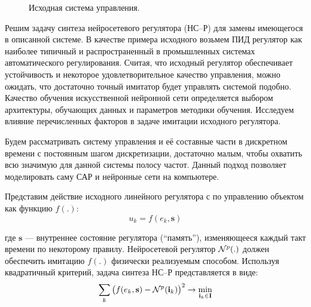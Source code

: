 \begin{figure}[h]
  \centering
  
  \caption{Исходная система управления.}
  \label{fig:ctrlloop}
\end{figure}

Решим задачу синтеза нейросетевого регулятора (НС--Р) для замены
имеющегося в описанной системе.  В качестве примера исходного возьмем
ПИД регулятор как наиболее типичный и распространенный в промышленных
системах автоматического регулирования.  Считая, что исходный
регулятор обеспечивает устойчивость и некоторое удовлетворительное
качество управления, можно ожидать, что достаточно точный имитатор
будет управлять системой подобно.  Качество обучения искусственной
нейронной сети определяется выбором архитектуры, обучающих данных и
параметров методики обучения.  Исследуем влияние перечисленных
факторов в задаче имитации исходного регулятора.

Будем рассматривать систему управления и её составные части в
дискретном времени с постоянным шагом дискретизации, достаточно малым,
чтобы охватить всю значимую для данной системы полосу частот.  Данный
подход позволяет моделировать саму САР и нейронные сети на компьютере.



Представим действие исходного линейного регулятора с
 по управлению объектом как функцию $f(.)$:
\begin{equation}\label{eq:raw_controller}
  u_k=f(e_k,\mathbf{s})
\end{equation}

\noindent где $\mathbf{s}$ --- внутреннее состояние регулятора
(``память''), изменяющееся каждый такт времени по некоторому правилу.
Нейросетевой регулятор $\mathcal{N}^p(.)$ должен обеспечить имитацию $f(.)$
физически реализуемым способом.  Используя квадратичный критерий,
задача синтеза НС--Р представляется в виде:
\begin{equation}\label{eq:nnp_synthesis_task}
  \sum\limits_k\big(f(e_k,\mathbf{s})-\NN^p(\mathbf{i}_k)\big)^2
  \rightarrow\min\limits_{\mathbf{i}_k\in\mathbf{I}}
\end{equation}

